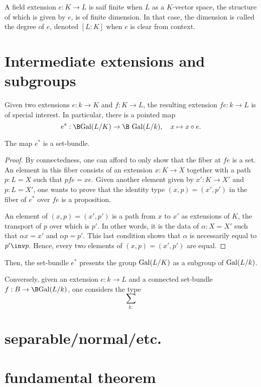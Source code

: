 \begin{definition}
  A field extension $e:K\to L$ is saif finite when $L$ as a
  $K$-vector space, the structure of which is given by $e$, is of finite dimension.
  In that case, the dimension is called the degree of $e$, denoted $[L:K]$ when $e$ is clear from context.
  \label{defn:degree-field-extension}
\end{definition} 

\section{Intermediate extensions and subgroups}
%
Given two extensions $e: k \to K$ and $f: K \to L$, the resulting extension
$fe:k \to L$ is of special interest.  In particular, there is a pointed map
\begin{displaymath}
  e^\ast: \B\Gal(L/K) \to \B \Gal(L/k),\quad x\mapsto x\circ e.
\end{displaymath}
\begin{lemma}
  The map $e^\ast$ is a set-bundle.
  \label{lem:intermediate-ext-to-subgroup}
\end{lemma}
\begin{proof}
  By connectedness, one can afford to only show that the fiber at $fe$ is a
  set. An element in this fiber consists of an extension $x:K \to X$ together
  with a path $p:L=X$ such that $pfe=xe$. Given another element given by $x':K
  \to X'$ and $p:L=X'$, one wants to prove that the identity type
  $(x,p)=(x',p')$ in the fiber of $e^\ast$ over $fe$ is a proposition.
  
  An element of $(x,p)=(x',p')$ is a path from $x$ to $x'$ as extensions of
  $K$, the transport of $p$ over which is $p'$. In other words, it is the data
  of $\alpha: X=X'$ such that $\alpha x = x'$ and $\alpha p = p'$. This last
  condition shows that $\alpha$ is necessarily equal to $p'\inv p$. Hence,
  every two elements of $(x,p)=(x',p')$ are equal.
\end{proof}

Then, the set-bundle $e^\ast$ presents the group $\mathrm{Gal}(L/K)$ as a subgroup of $\mathrm{Gal}(L/k)$.

Conversely, given an extension $e:k \to L$ and a connected set-bundle $f:B \to \B \Gal(L/k)$, one considers the type
\begin{displaymath}
  \sum_{k:}
\end{displaymath}

\section{separable/normal/etc.}
\label{sec:cover-spac-fields-1}

\section{fundamental theorem}
\label{sec:fundamental-theorem}




